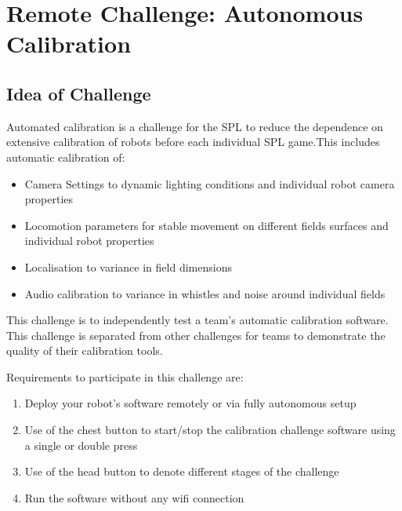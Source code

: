\section{Remote Challenge: Autonomous Calibration}
\label{sec:AutonmousCalibration}




\subsection{Idea of Challenge}

Automated calibration is a challenge for the SPL to reduce the dependence on extensive calibration of robots before each individual SPL game.This includes automatic calibration of:
\begin{itemize}
    \item Camera Settings to dynamic lighting conditions and individual robot camera properties
    \item Locomotion parameters for stable movement on different fields surfaces and individual robot properties
    \item Localisation to variance in field dimensions
    \item Audio calibration to variance in whistles and noise around individual fields
\end{itemize}

This challenge is to independently test a team's automatic calibration software. This challenge is separated from other challenges for teams to demonstrate the quality of their calibration tools.

Requirements to participate in this challenge are:
\begin{enumerate}
    \item Deploy your robot's software remotely or via fully autonomous setup
    \item Use of the chest button to start/stop the calibration challenge software using a single or double press
    \item Use of the head button to denote different stages of the challenge
    \item Run the software without any wifi connection
\end{enumerate}

